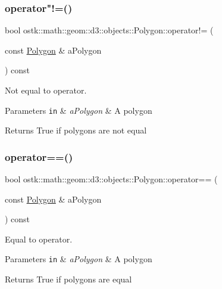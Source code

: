 \subsubsection{\texorpdfstring{operator"!=()}{operator!=()}}
{\footnotesize\ttfamily bool ostk\+::math\+::geom\+::d3\+::objects\+::\+Polygon\+::operator!= (\begin{DoxyParamCaption}\item[{const \hyperlink{classostk_1_1math_1_1geom_1_1d3_1_1objects_1_1_polygon}{Polygon} \&}]{a\+Polygon }\end{DoxyParamCaption}) const}



Not equal to operator. 


\begin{DoxyParams}[1]{Parameters}
\mbox{\tt in}  & {\em a\+Polygon} & A polygon \\
\hline
\end{DoxyParams}
\begin{DoxyReturn}{Returns}
True if polygons are not equal 
\end{DoxyReturn}
\mbox{\label{classostk_1_1math_1_1geom_1_1d3_1_1objects_1_1_polygon_aaf7f2adc05d3847d6624a1fd4f2bd139}} 
\subsubsection{\texorpdfstring{operator==()}{operator==()}}
{\footnotesize\ttfamily bool ostk\+::math\+::geom\+::d3\+::objects\+::\+Polygon\+::operator== (\begin{DoxyParamCaption}\item[{const \hyperlink{classostk_1_1math_1_1geom_1_1d3_1_1objects_1_1_polygon}{Polygon} \&}]{a\+Polygon }\end{DoxyParamCaption}) const}



Equal to operator. 


\begin{DoxyParams}[1]{Parameters}
\mbox{\tt in}  & {\em a\+Polygon} & A polygon \\
\hline
\end{DoxyParams}
\begin{DoxyReturn}{Returns}
True if polygons are equal 
\end{DoxyReturn}
\mbox{\label{classostk_1_1math_1_1geom_1_1d3_1_1objects_1_1_polygon_abe478a380cdd22efb082590fda923201}} 

